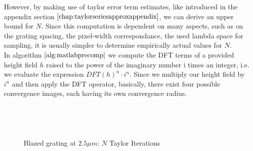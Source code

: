 However, by making use of taylor error term estimates, like introduced in the appendix section $\ref{chap:taylorseriesapproxappendix}$, we can derive an upper bound for $N$. Since this computation is dependent on many aspects, such as on the grating spacing, the pixel-width correspondance, the used lambda space for sampling, it is usually simpler to determine empirically actual values for $N$. \\

In algorithm $\ref{alg:matlabprecomp}$ we compute the DFT terms of a provided height field $h$ raised to the power of the imaginary number i times an integer, i.e. we evaluate the expression $DFT(h)^n \cdot i^n$. Since we multiply our height field by $i^n$ and then apply the DFT operator, basically, there exist four possible convergence images, each having its own convergence radius.

\begin{figure}[H]
  \centering
~
~
~  
~

~  
~  
~  
~ 
  
  
\caption[BRDF Map: Blazed Grating Convergence]{Blazed grating at $2.5 \mu m$: $N$ Taylor Iterations}
\label{fig:brdfmapstayloriterationsblaze}
\end{figure}

